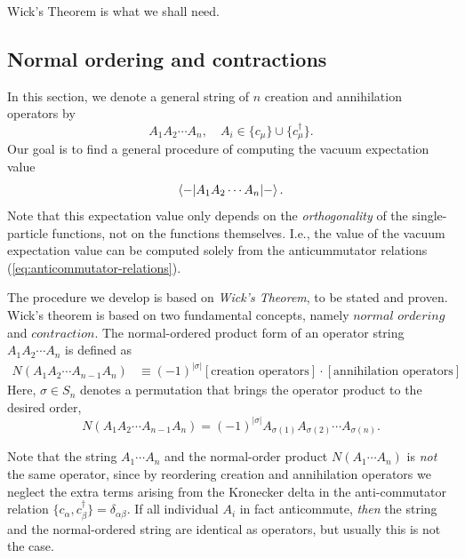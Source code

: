 \documentclass{report}
\theoremstyle{plain}
\theoremstyle{definition}
\begin{document}
Wick's Theorem is what we shall need.

\subsection{Normal ordering and contractions}

\newcommand*{\pr}[1]{\left(#1\right)}
\newcommand*{\fpr}[1]{\left[#1\right]}
\newcommand*{\kpr}[1]{N\left(#1\right)}
\newcommand*{\for}[3]{\langle#1|#2|#3\rangle}
\newcommand{\OP}[1]{{\hat{#1}}}
\newcommand*{\cre}[1]{c^{\dagger}_{#1}}
\newcommand*{\an}[1]{c_{#1}}

In this section, we denote a general string of $n$ creation and
annihilation operators by
\begin{equation}
  A_1 A_2 \cdots A_n, \quad A_i \in \{ c_\mu \} \cup \{ c^\dag_\mu \}.
\end{equation}
Our goal is to find a general procedure of computing the vacuum
expectation value
\begin{equation}
  \braket{-|A_1A_2\cdots A_n|-}.
\end{equation}
Note that this expectation value only depends on the \emph{orthogonality} of the
single-particle functions, not on the functions themselves. I.e., the
value of the vacuum expectation value can be computed solely from the
anticummutator relations (\ref{eq:anticommutator-relations}).

The procedure we develop is based on \emph{Wick's Theorem}, to be stated and
proven.  Wick's theorem is based on two fundamental concepts, namely
$\textit{normal ordering}$ and $\textit{contraction}$. The
normal-ordered product form of an operator string $A_1A_2\cdots A_n$ is
defined as
\begin{align}
  \label{eq:normal-ordering-def}
  N({A}_1{A}_2\cdots{A}_{n-1}{A}_n) &\equiv (-1)^{|\sigma|}
  \fpr{\text{creation operators}}\cdot\fpr{\text{annihilation
      operators}}
\end{align}
Here, $\sigma \in S_n$ denotes a permutation that brings the operator
product to the desired order,
\begin{equation}
  N({A}_1{A}_2\cdots{A}_{n-1}{A}_n) = (-1)^{|\sigma|} A_{\sigma(1)}
  A_{\sigma(2)} \cdots A_{\sigma(n)}.
\end{equation}

Note that the string $A_1\cdots A_n$ and the normal-order product
$N(A_1\cdots A_n)$ is \emph{not} the same operator, since
by reordering creation and annihilation operators we neglect the extra
terms arising from the Kronecker delta in the anti-commutator relation
$\{c_\alpha, c^\dag_\beta\} = \delta_{\alpha\beta}$. If all individual
$A_i$ in fact anticommute, \emph{then} the string and the normal-ordered
string are identical as operators, but usually this is not the case.
\end{document}
